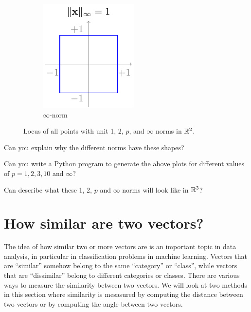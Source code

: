 \begin{figure}[h]
\begin{subfigure}[b]{0.24\textwidth}
        \centering
        \includegraphics{figure/chapter01/norminf.pdf}
        \caption{$\infty$-norm}
        \label{fig:norminf}
    \end{subfigure}
    \caption{Locus of all points with unit 1, 2, $p$, and $\infty$ norms in $\mathbb{R}^2$.}
\end{figure}

\begin{boxedstuff}
    \begin{problem}
        Can you explain why the different norms have these shapes? 
    \end{problem}
    \begin{problem}
        Can you write a Python program to generate the above plots for different values of $p = 1, 2, 3, 10$ and $\infty$?
    \end{problem}
    \begin{problem}
        Can describe what these 1, 2, $p$ and $\infty$ norms will look like in $\mathbb{R}^3$?
    \end{problem}
\end{boxedstuff}

\section{How similar are two vectors?}
The idea of how similar two or more vectors are is an important topic  in data analysis, in particular in classification problems in machine learning. Vectors that are ``similar'' somehow belong to the same ``category'' or ``class'', while vectors that are ``dissimilar'' belong to different categories or classes. There are various ways to measure the similarity between two vectors. We will look at two methods in this section where similarity is mesasured by computing the distance between two vectors or by computing the angle between two vectors.

